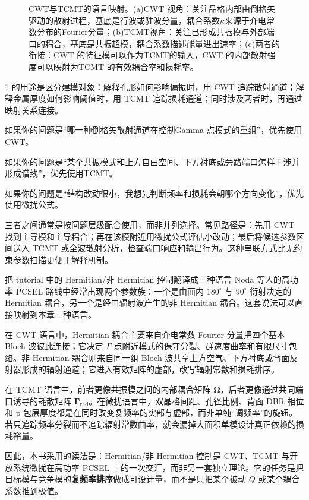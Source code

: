 \begin{figure}[htbp]
  \centering
  
  \caption{CWT与TCMT的语言映射。(a)CWT 视角：关注晶格内部由倒格矢驱动的散射过程，基底是行波或驻波分量，耦合系数$\kappa$来源于介电常数分布的Fourier分量；(b)TCMT视角：关注已形成共振模与外部端口的耦合，基底是共振超模，耦合系数描述能量进出速率；(c)两者的衔接：CWT 的特征模可以作为TCMT的输入，CWT 的内部散射强度可以映射为TCMT 的有效耦合率和损耗率。}
  \label{fig:ch11_cwt_cmt_mapping}
\end{figure}

\cref{fig:ch11_cwt_cmt_mapping} 的用途是区分建模对象：解释孔形如何影响偏振时，用 CWT 追踪散射通道；解释金属厚度如何影响阈值时，用 TCMT 追踪损耗通道；同时涉及两者时，再通过映射关系连接。

如果你的问题是“哪一种倒格矢散射通道在控制Gamma 点模式的重组”，优先使用 CWT。

如果你的问题是“某个共振模式和上方自由空间、下方衬底或旁路端口怎样干涉并形成谱线”，优先使用TCMT。

如果你的问题是“结构改动很小，我想先判断频率和损耗会朝哪个方向变化”，优先使用微扰公式。

三者之间通常是按问题层级配合使用，而非并列选择。常见路径是：先用 CWT 找到主导模和主导耦合；再在该模附近用微扰公式评估小改动；最后将候选参数区间送入 TCMT 或全波散射分析，检查端口响应和输出行为。这种串联方式比无约束参数扫描更便于解释机制。

\begin{ApplicationBox}{把 tutorial 中的 Hermitian/非 Hermitian 控制翻译成三种语言}
Noda 等人的高功率 PCSEL 路线中经常出现两个参数族：一个是由面内 $180^\circ$ 与 $90^\circ$ 衍射决定的 Hermitian 耦合，另一个是经由辐射波产生的非 Hermitian 耦合\cite{noda2023tutorial,yoshida2023}。这套说法可以直接映射到本章三种语言。

在 CWT 语言中，Hermitian 耦合主要来自介电常数 Fourier 分量把四个基本 Bloch 波彼此连接；它决定 $\Gamma$ 点附近模式的保守分裂、群速度曲率和有限尺寸包络。非 Hermitian 耦合则来自同一组 Bloch 波共享上方空气、下方衬底或背面反射器形成的辐射通道；它进入有效矩阵的虚部，改写辐射常数和损耗排序。

在 TCMT 语言中，前者更像共振模之间的内部耦合矩阵 $\bm{\Omega}$，后者更像通过共同端口诱导的耗散矩阵 $\bm{\Gamma}_{\mathrm{rad}}$。在微扰语言中，双晶格间距、孔径比例、背面 DBR 相位和 p 包层厚度都是在同时改变复频率的实部与虚部，而非单纯“调频率”的旋钮。若只追踪频率分裂而不追踪辐射常数曲率，就会漏掉大面积单模设计真正依赖的损耗裕量。

因此，本书采用的读法是：Hermitian/非 Hermitian 控制是 CWT、TCMT 与开放系统微扰在高功率 PCSEL 上的一次交汇，而非另一套独立理论。它的任务是把目标模与竞争模的\textbf{复频率排序}做成可设计量，而不是只把某个被动 $Q$ 或某个耦合系数推到极值。
\end{ApplicationBox}

